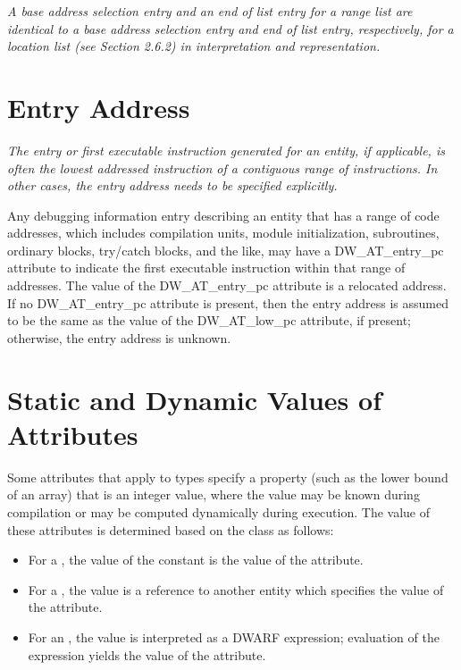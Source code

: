 \textit{A base address selection entry and an end of list entry for
a range list are identical to a base address selection entry
and end of list entry, respectively, for a location list
(see Section 2.6.2) in interpretation and representation.}



\section{Entry Address}
\label{chap:entryaddress}
\textit{The entry or first executable instruction generated
for an entity, if applicable, is often the lowest addressed
instruction of a contiguous range of instructions. In other
cases, the entry address needs to be specified explicitly.}

Any debugging information entry describing an entity that has
a range of code addresses, which includes compilation units,
module initialization, subroutines, ordinary blocks, try/catch
blocks, and the like, may have a DW\_AT\_entry\_pc attribute to
indicate the first executable instruction within that range
of addresses. The value of the DW\_AT\_entry\_pc attribute is a
relocated address. If no DW\_AT\_entry\_pc attribute is present,
then the entry address is assumed to be the same as the
value of the DW\_AT\_low\_pc attribute, if present; otherwise,
the entry address is unknown.

\section{Static and Dynamic Values of Attributes}
\label{chap:staticanddynamicvaluesofattributes}

Some attributes that apply to types specify a property (such
as the lower bound of an array) that is an integer value,
where the value may be known during compilation or may be
computed dynamically during execution.  The value of these
attributes is determined based on the class as follows:

\begin{itemize}
\item For a , the value of the constant is the value of
the attribute.

\item For a , the
value is a reference to another
entity which specifies the value of the attribute.

\item For an , the value is interpreted as a 
DWARF expression; 
evaluation of the expression yields the value of
the attribute.
\end{itemize}

